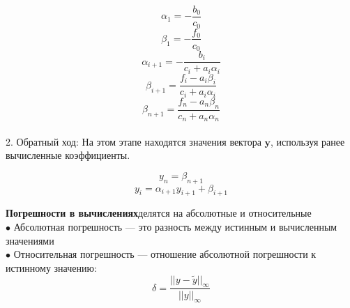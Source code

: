 \documentclass[a4paper, 12pt]{report}
\begin{document}
   $$\alpha_{1} = -\frac{b_{0}}{c_{0}}$$
   $$\beta_{1} = -\frac{f_{0}}{c_{0}}$$
   $$\alpha_{i + 1} = -\frac{b_{i}}{c_{i} + a_{i} \alpha_{i}}$$
   $$\beta_{i + 1} = \frac{f_{i} - a_{i} \beta_{i}}{c_{i} + a_{i} \alpha_{i}}$$
   $$\beta_{n + 1} = \frac{f_{n} - a_{n} \beta_{n}}{c_{n} + a_{n} \alpha_{n}}$$
\\
2. Обратный ход:
   На этом этапе находятся значения вектора $\mathbf{y}$, используя ранее вычисленные коэффициенты.

   
   $$y_{n} = \beta_{n + 1}$$ 
   $$y_{i} = \alpha_{i + 1} y_{i+1} + \beta_{i + 1}$$

   \textbf{Погрешности в вычислениях}делятся на абсолютные и относительные\\
   $\bullet$ Абсолютная погрешность — это разность между истинным и вычисленным значениями\\
   $\bullet$ Относительная погрешность — отношение абсолютной погрешности к истинному значению:$$\delta =  \dfrac {||y - \tilde{y}||_{\infty}}{||y||_{\infty}}$$\\
   \\
\end{document}
